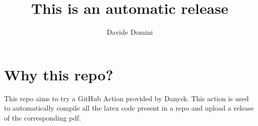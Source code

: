 \documentclass[11pt, oneside]{article}   	%
\title{This is an automatic release}
\author{Davide Domini}
\begin{document}
\maketitle
\section{Why this repo?}
This repo aims to try a GitHub Action provided by Danysk. This action is used to automatically compile all the latex code present in a repo and upload a release of the corresponding pdf.
\end{document}
